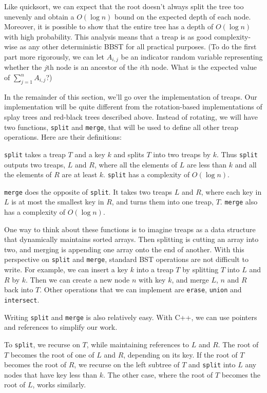 Like quicksort, we can expect that the root doesn't always split the tree too unevenly and obtain a $O(\log n)$ bound on the expected depth of each node. Moreover, it is possible to show that the entire tree has a depth of $O(\log n)$ with high probability. This analysis means that a treap is as good complexity-wise as any other deterministic BBST for all practical purposes. (To do the first part more rigorously, we can let $A_{i,j}$ be an indicator random variable representing whether the $j$th node is an ancestor of the $i$th node. What is the expected value of $\sum_{j=1}^n A_{i,j}$?) 

In the remainder of this section, we'll go over the implementation of treaps. Our implementation will be quite different from the rotation-based implementations of splay trees and red-black trees described above. Instead of rotating, we will have two functions, \texttt{split} and \texttt{merge}, that will be used to define all other treap operations. Here are their definitions:

\texttt{split} takes a treap $T$ and a key $k$ and splits $T$ into two treaps by $k$. Thus \texttt{split} outputs two treaps, $L$ and $R$, where all the elements of $L$ are less than $k$ and all the elements of $R$ are at least $k$. \texttt{split} has a complexity of $O(\log n)$.

\texttt{merge} does the opposite of \texttt{split}. It takes two treaps $L$ and $R$, where each key in $L$ is at most the smallest key in $R$, and turns them into one treap, $T$. \texttt{merge} also has a complexity of $O(\log n)$.

One way to think about these functions is to imagine treaps as a data structure that dynamically maintains sorted arrays. Then splitting is cutting an array into two, and merging is appending one array onto the end of another. With this perspective on \texttt{split} and \texttt{merge}, standard BST operations are not difficult to write. For example, we can insert a key $k$ into a treap $T$ by splitting $T$ into $L$ and $R$ by $k$. Then we can create a new node $n$ with key $k$, and merge $L$, $n$ and $R$ back into $T$. Other operations that we can implement are \texttt{erase}, \texttt{union} and \texttt{intersect}. 

Writing \texttt{split} and \texttt{merge} is also relatively easy. With C++, we can use pointers and references to simplify our work.

To \texttt{split}, we recurse on $T$, while maintaining references to $L$ and $R$. The root of $T$ becomes the root of one of $L$ and $R$, depending on its key. If the root of $T$ becomes the root of $R$, we recurse on the left subtree of $T$ and \texttt{split} into $L$ any nodes that have key less than $k$. The other case, where the root of $T$ becomes the root of $L$, works similarly.

